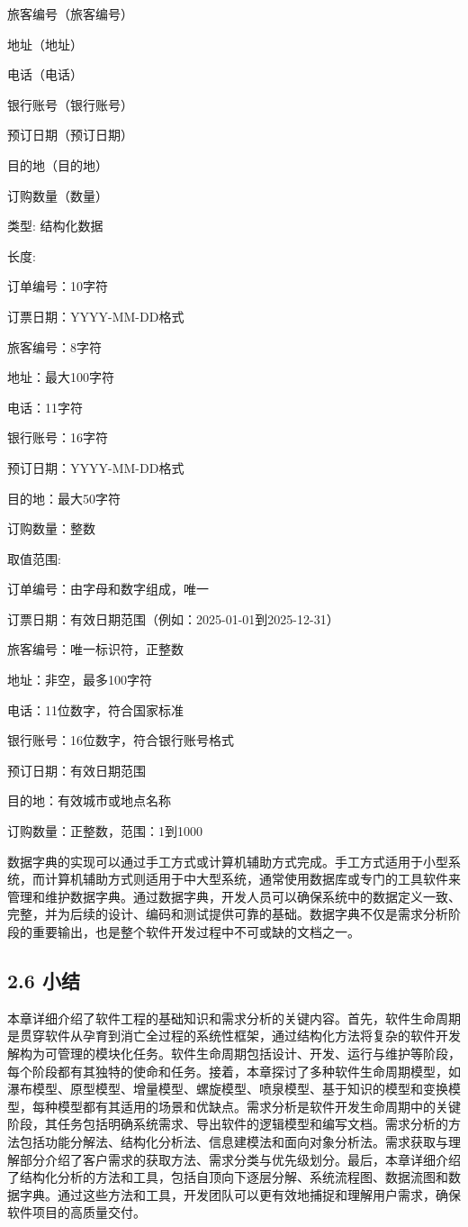 旅客编号（旅客编号）

地址（地址）

电话（电话）

银行账号（银行账号）

预订日期（预订日期）

目的地（目的地）

订购数量（数量）

类型: 结构化数据

长度:

订单编号：10字符

订票日期：YYYY-MM-DD格式

旅客编号：8字符

地址：最大100字符

电话：11字符

银行账号：16字符

预订日期：YYYY-MM-DD格式

目的地：最大50字符

订购数量：整数

取值范围:

订单编号：由字母和数字组成，唯一

订票日期：有效日期范围（例如：2025-01-01到2025-12-31）

旅客编号：唯一标识符，正整数

地址：非空，最多100字符

电话：11位数字，符合国家标准

银行账号：16位数字，符合银行账号格式

预订日期：有效日期范围

目的地：有效城市或地点名称

订购数量：正整数，范围：1到1000

数据字典的实现可以通过手工方式或计算机辅助方式完成。手工方式适用于小型系统，而计算机辅助方式则适用于中大型系统，通常使用数据库或专门的工具软件来管理和维护数据字典。通过数据字典，开发人员可以确保系统中的数据定义一致、完整，并为后续的设计、编码和测试提供可靠的基础。数据字典不仅是需求分析阶段的重要输出，也是整个软件开发过程中不可或缺的文档之一。

\subsection{2.6 小结}\label{ux5c0fux7ed3}

本章详细介绍了软件工程的基础知识和需求分析的关键内容。首先，软件生命周期是贯穿软件从孕育到消亡全过程的系统性框架，通过结构化方法将复杂的软件开发解构为可管理的模块化任务。软件生命周期包括设计、开发、运行与维护等阶段，每个阶段都有其独特的使命和任务。接着，本章探讨了多种软件生命周期模型，如瀑布模型、原型模型、增量模型、螺旋模型、喷泉模型、基于知识的模型和变换模型，每种模型都有其适用的场景和优缺点。需求分析是软件开发生命周期中的关键阶段，其任务包括明确系统需求、导出软件的逻辑模型和编写文档。需求分析的方法包括功能分解法、结构化分析法、信息建模法和面向对象分析法。需求获取与理解部分介绍了客户需求的获取方法、需求分类与优先级划分。最后，本章详细介绍了结构化分析的方法和工具，包括自顶向下逐层分解、系统流程图、数据流图和数据字典。通过这些方法和工具，开发团队可以更有效地捕捉和理解用户需求，确保软件项目的高质量交付。
